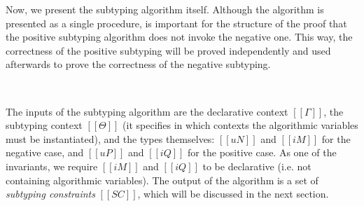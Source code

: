 \documentclass[acmsmall,natbib=false,review,anonymous]{acmart}
\begin{document}
Now, we present the subtyping algorithm itself.
Although the algorithm is presented as a single procedure,
is important for the structure of the proof that the positive subtyping algorithm
does not invoke the negative one. This way, the correctness of the positive 
subtyping will be proved independently and used afterwards to prove the
correctness of the negative subtyping.


\begin{algorithm}[Subtyping]
  \label{alg:subtyping}
  \hfill\\
  \ottdefnANsub{}
  \ottdefnAPsup{}
\end{algorithm}

The inputs of the subtyping algorithm are the declarative context $[[Γ]]$,
the subtyping context $[[Θ]]$ (it specifies in which contexts the algorithmic variables
must be instantiated), and the types themselves: $[[uN]]$ and $[[iM]]$ for the negative case,
and $[[uP]]$ and $[[iQ]]$ for the positive case. 
As one of the invariants, we require
$[[iM]]$ and $[[iQ]]$ to be declarative (i.e. not containing algorithmic variables).
The output of the algorithm is a set of \emph{subtyping constraints} $[[SC]]$,
which will be discussed in the next section.
\end{document}
